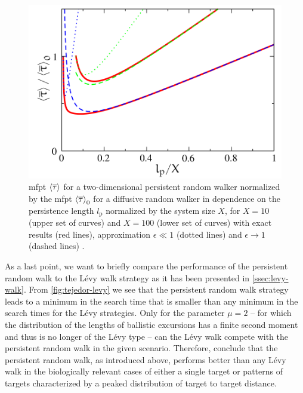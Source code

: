 \begin{figure}[bth]
 \myfloatalign
 \includegraphics[width=0.8\linewidth]{gfx/tejedor-graph}
 \caption[]{\ac{mfpt} $\mfpt[\mean{\tau}]$ for a two-dimensional persistent random walker normalized by the \ac{mfpt} $\mfpt[\mean{\tau}]_0$ for a diffusive random walker in dependence on the persistence length $l_\textrm{p}$ normalized by the system size $X$, for $X = 10$ (upper set of curves) and $X = 100$ (lower set of curves) with exact results (red lines), approximation $\epsilon \ll 1$ (dotted lines) and $\epsilon \rightarrow 1$ (dashed lines) \cite{tejedor:2012}.}\label{fig:tejedor-graph}
\end{figure}

As a last point, we want to briefly compare the performance of the persistent random walk to the Lévy walk strategy as it has been presented in \autoref{ssec:levy-walk}. From \autoref{fig:tejedor-levy} we see that the persistent random walk strategy leads to a minimum in the search time that is smaller than any minimum in the search times for the Lévy strategies. Only for the parameter $\mu = 2$ -- for which the distribution of the lengths of ballistic excursions has a finite second moment and thus is no longer of the Lévy type -- can the Lévy walk compete with the persistent random walk in the given scenario. Therefore, \citeauthor{tejedor:2012} \cite{tejedor:2012} conclude that the persistent random walk, as introduced above, performs better than any Lévy walk in the biologically relevant cases of either a single target or patterns of targets characterized by a peaked distribution of target to target distance.

